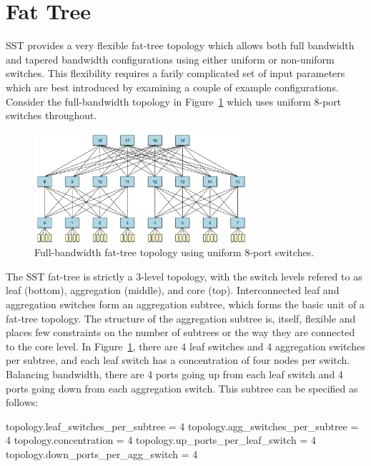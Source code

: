 
\section{Fat Tree}
\label{sec:tutorial:fattree}

SST provides a very flexible fat-tree topology which allows both full bandwidth and tapered bandwidth configurations using either uniform or non-uniform switches.
This flexibility requires a farily complicated set of input parameters which are best introduced by examining a couple of example configurations.  Consider the full-bandwidth topology in Figure~\ref{fig:topologies:fullfattree} which uses uniform 8-port switches throughout.

\begin{figure}[h!]
\centering
\includegraphics[width=0.7\textwidth]{figures/topologies/fattree4.png}
\caption{Full-bandwidth fat-tree topology using uniform 8-port switches.}
\label{fig:topologies:fullfattree}
\end{figure}

The SST fat-tree is strictly a 3-level topology, with the switch levels refered to as leaf (bottom), aggregation (middle), and core (top).
Interconnected leaf and aggregation switches form an aggregation subtree, which forms the basic unit of a fat-tree topology.
The structure of the aggregation subtree is, itself, flexible and places few constraints on the number of subtrees or the way they are connected to the core level.
In Figure~\ref{fig:topologies:fullfattree}, there are 4 leaf switches and 4 aggregation switches per subtree, and each leaf switch has a concentration of four nodes per switch.
Balancing bandwidth, there are 4 ports going up from each leaf switch and 4 ports going down from each aggregation switch.
This subtree can be specified as follows:

\begin{ViFile}
topology.leaf_switches_per_subtree = 4
topology.agg_switches_per_subtree = 4
topology.concentration = 4
topology.up_ports_per_leaf_switch = 4
topology.down_ports_per_agg_switch = 4
\end{ViFile}

